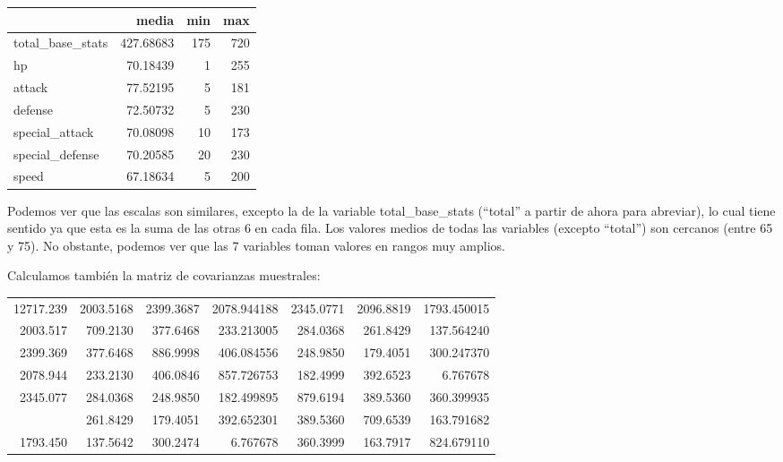 \documentclass[
  12pt,
]{extreport}
\begin{document}
\begin{table}[H]
\centering
\begin{tabular}{lrrr}
\toprule
  & media & min & max\\
\midrule
total\_base\_stats & 427.68683 & 175 & 720\\
hp & 70.18439 & 1 & 255\\
attack & 77.52195 & 5 & 181\\
defense & 72.50732 & 5 & 230\\
special\_attack & 70.08098 & 10 & 173\\
\addlinespace
special\_defense & 70.20585 & 20 & 230\\
speed & 67.18634 & 5 & 200\\
\bottomrule
\end{tabular}
\end{table}

Podemos ver que las escalas son similares, excepto la de la variable
total\_base\_stats (``total'' a partir de ahora para abreviar), lo cual
tiene sentido ya que esta es la suma de las otras 6 en cada fila. Los
valores medios de todas las variables (excepto ``total'') son cercanos
(entre 65 y 75). No obstante, podemos ver que las 7 variables toman
valores en rangos muy amplios.

Calculamos también la matriz de covarianzas muestrales:

\begin{table}[H]
\centering\begingroup\fontsize{9}{11}\selectfont

\begin{tabular}{rrrrrrr}
\toprule
12717.239 & 2003.5168 & 2399.3687 & 2078.944188 & 2345.0771 & 2096.8819 & 1793.450015\\
2003.517 & 709.2130 & 377.6468 & 233.213005 & 284.0368 & 261.8429 & 137.564240\\
2399.369 & 377.6468 & 886.9998 & 406.084556 & 248.9850 & 179.4051 & 300.247370\\
2078.944 & 233.2130 & 406.0846 & 857.726753 & 182.4999 & 392.6523 & 6.767678\\
2345.077 & 284.0368 & 248.9850 & 182.499895 & 879.6194 & 389.5360 & 360.399935\\
\addlinespace
2096.882 & 261.8429 & 179.4051 & 392.652301 & 389.5360 & 709.6539 & 163.791682\\
1793.450 & 137.5642 & 300.2474 & 6.767678 & 360.3999 & 163.7917 & 824.679110\\
\bottomrule
\end{tabular}
\endgroup{}
\end{table}
\end{document}
